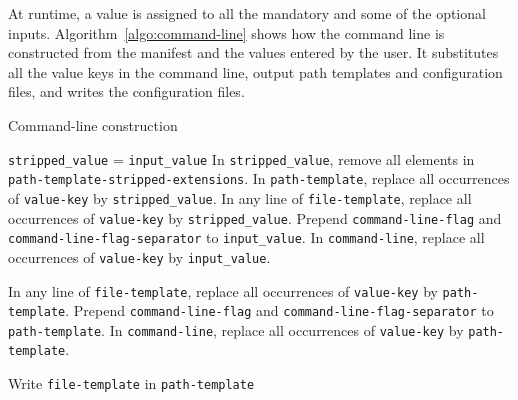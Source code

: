 \documentclass{article}
\begin{document}
At runtime, a value is assigned to all the mandatory and some of the
optional inputs. %
Algorithm~\ref{algo:command-line} shows how the command line is
constructed from the manifest and the values entered by the user. It
substitutes all the value keys in the command line, output path
templates and configuration files, and writes the configuration files.
\begin{algorithm}[h!]
\caption{Command-line construction}
\label{algo:command-line}
\begin{algorithmic}
  \State {}
  \State \texttt{stripped\_value} = \texttt{input\_value}
  \State In \texttt{stripped\_value}, remove  all elements in \texttt{path-template-stripped-extensions}.
  \EndIf
  \State In \texttt{path-template}, replace all occurrences of \texttt{value-key} by \texttt{stripped\_value}.
  \State In any line of \texttt{file-template}, replace all occurrences of \texttt{value-key} by \texttt{stripped\_value}.
  \EndIf
  \EndFor
  \State Prepend \texttt{command-line-flag} and \texttt{command-line-flag-separator} to \texttt{input\_value}.
  \State In \texttt{command-line}, replace all occurrences of \texttt{value-key} by \texttt{input\_value}.
  \EndIf
  \EndFor

  \State {}
  \State In any line of \texttt{file-template}, replace all occurrences of \texttt{value-key} by \texttt{path-template}.
  \State {}
  \EndIf
  \EndFor
  \State Prepend \texttt{command-line-flag} and \texttt{command-line-flag-separator} to \texttt{path-template}.
  \State In \texttt{command-line}, replace all occurrences of \texttt{value-key} by \texttt{path-template}.
  \EndIf
  \EndFor

  \State {}
  \State Write \texttt{file-template} in \texttt{path-template}
  \State {}
  \EndIf
  \EndFor

\end{algorithmic}
\end{algorithm}
\end{document}

